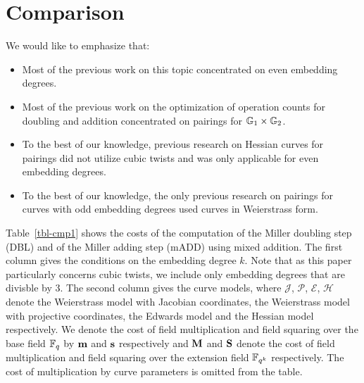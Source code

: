 \section{Comparison}
\label{sec:cmp}

We would like to emphasize that:
\begin{itemize}
\item	Most of the previous work on this topic concentrated on even embedding degrees.
\item   Most of the previous work on the optimization of operation counts for doubling and addition concentrated on pairings for $\mathbb{G}_{1} \times \mathbb{G}_{2}$.
\item   To the best of our knowledge, previous research on Hessian curves for pairings did not utilize cubic twists and was only applicable for even embedding degrees.
\item   To the best of our knowledge, the only previous research on pairings for curves with odd embedding degrees used curves in Weierstrass form.
\end{itemize}

Table~\ref{tbl-cmp1} shows the costs of the computation of the Miller doubling step (DBL) and of the Miller adding step (mADD) using mixed addition.
The first column gives the conditions on the embedding degree $k$.
Note that as this paper particularly concerns cubic twists, we include only embedding degrees that are divisble by 3.
The second column gives the curve models, where 
$\mathcal{J}$, $\mathcal{P}$, $\mathcal{E}$, $\mathcal{H}$ denote the
Weierstrass model with Jacobian coordinates, the
Weierstrass model with projective coordinates,
the Edwards model and the
Hessian model respectively.
We denote the cost of field multiplication and field squaring over the base field $\mathbb{F}_{q}$ by $\textbf{m}$ and $\textbf{s}$ respectively and $\textbf{M}$ and $\textbf{S}$ denote the cost of field multiplication and field squaring over the extension field $\mathbb{F}_{q^k}$ respectively.
The cost of multiplication by curve parameters is omitted from the table.


